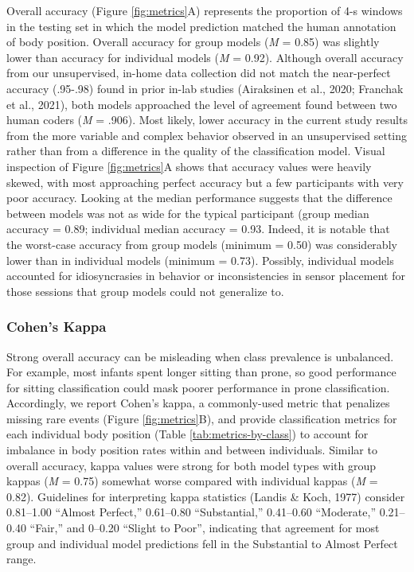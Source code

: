 \documentclass[
  man]{apa6}
\begin{document}
Overall accuracy (Figure \ref{fig:metrics}A) represents the proportion of 4-s windows in the testing set in which the model prediction matched the human annotation of body position. Overall accuracy for group models (\emph{M} = 0.85) was slightly lower than accuracy for individual models (\emph{M} = 0.92). Although overall accuracy from our unsupervised, in-home data collection did not match the near-perfect accuracy (.95-.98) found in prior in-lab studies (Airaksinen et al., 2020; Franchak et al., 2021), both models approached the level of agreement found between two human coders (\emph{M} = .906). Most likely, lower accuracy in the current study results from the more variable and complex behavior observed in an unsupervised setting rather than from a difference in the quality of the classification model. Visual inspection of Figure \ref{fig:metrics}A shows that accuracy values were heavily skewed, with most approaching perfect accuracy but a few participants with very poor accuracy. Looking at the median performance suggests that the difference between models was not as wide for the typical participant (group median accuracy = 0.89; individual median accuracy = 0.93. Indeed, it is notable that the worst-case accuracy from group models (minimum = 0.50) was considerably lower than in individual models (minimum = 0.73). Possibly, individual models accounted for idiosyncrasies in behavior or inconsistencies in sensor placement for those sessions that group models could not generalize to.

\hypertarget{cohens-kappa}{%
\subsubsection{Cohen's Kappa}\label{cohens-kappa}}

Strong overall accuracy can be misleading when class prevalence is unbalanced. For example, most infants spent longer sitting than prone, so good performance for sitting classification could mask poorer performance in prone classification. Accordingly, we report Cohen's kappa, a commonly-used metric that penalizes missing rare events (Figure \ref{fig:metrics}B), and provide classification metrics for each individual body position (Table \ref{tab:metrics-by-class}) to account for imbalance in body position rates within and between individuals. Similar to overall accuracy, kappa values were strong for both model types with group kappas (\emph{M} = 0.75) somewhat worse compared with individual kappas (\emph{M} = 0.82). Guidelines for interpreting kappa statistics (Landis \& Koch, 1977) consider 0.81--1.00 ``Almost Perfect,'' 0.61--0.80 ``Substantial,'' 0.41--0.60 ``Moderate,'' 0.21-- 0.40 ``Fair,'' and 0--0.20 ``Slight to Poor'', indicating that agreement for most group and individual model predictions fell in the Substantial to Almost Perfect range.
\end{document}
